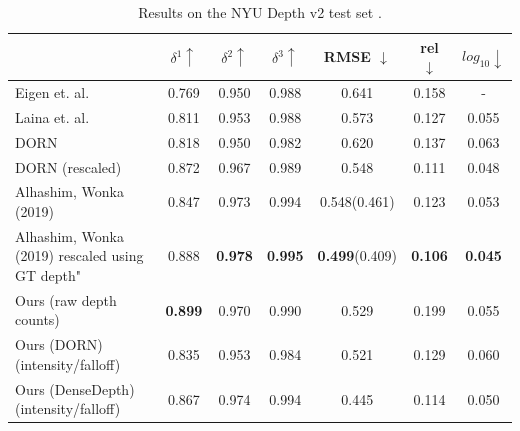 \begin{table}
\begin{center}
\begin{tabular}{lccc|ccc}
  \toprule
    & $\delta^1 \uparrow$ & $\delta^2\uparrow$ & $\delta^3 \uparrow$ & RMSE $\downarrow$ & rel $\downarrow$ & $log_{10} \downarrow$ \\
  \midrule
Eigen et. al. & 0.769 & 0.950 & 0.988 & 0.641 & 0.158 & - \\ 
Laina et. al.&0.811&0.953&0.988&0.573&0.127&0.055 \\
DORN&0.818&0.950&0.982&0.620&0.137&0.063 \\
  DORN (rescaled) & 0.872 & 0.967 & 0.989 & 0.548 & 0.111 & 0.048 \\
Alhashim, Wonka (2019)&0.847&0.973&0.994&0.548(0.461)&0.123&0.053 \\
Alhashim, Wonka (2019) rescaled using GT depth"&0.888&\textbf{0.978}&\textbf{0.995}&\textbf{0.499}(0.409)&\textbf{0.106}&\textbf{0.045} \\
  \midrule
  Ours (raw depth counts) & \textbf{0.899} & 0.970 & 0.990 & 0.529 & 0.199 & 0.055 \\
  Ours (DORN) (intensity/falloff) & 0.835 & 0.953 & 0.984 & 0.521 & 0.129 & 0.060 \\
  Ours (DenseDepth) (intensity/falloff) & 0.867 & 0.974 & 0.994 & 0.445 & 0.114 & 0.050 \\
  \bottomrule
\end{tabular} 
\end{center}
\caption{Results on the NYU Depth v2 test set \cite{nyudepth}.}
\end{table}
